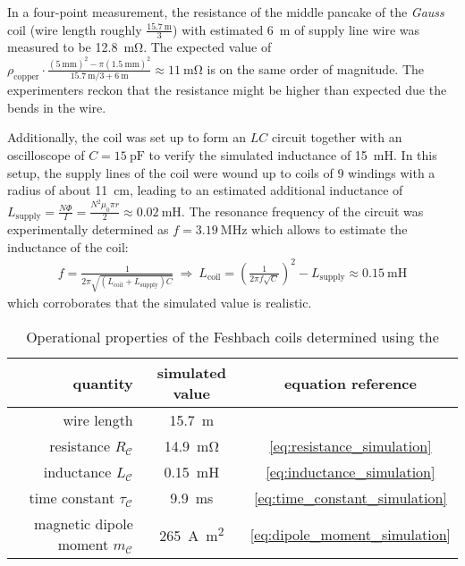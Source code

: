 In a four-point measurement, the resistance of the middle pancake of the \textit{Gauss} coil (wire length roughly $\frac{\SI{15.7}{\meter}}{3}$) with estimated \SI{6}{\meter} of supply line wire was measured to be \SI{12.8}{\milli\ohm}. The expected value of $\rho_\text{copper} \cdot \frac{(\SI{5}{\milli\meter})^2 - \pi(\SI{1.5}{\milli\meter})^2}{\SI{15.7}{\meter}/3 + \SI{6}{\meter}} \approx \SI{11}{\milli\ohm}$ is on the same order of magnitude. The experimenters reckon that the resistance might be higher than expected due the bends in the wire.

Additionally, the coil was set up to form an $LC$ circuit together with an oscilloscope of $C = \SI{15}{\pico\farad}$ to verify the simulated inductance of \SI{15}{\milli\henry}. In this setup, the supply lines of the coil were wound up to coils of $9$ windings with a radius of about \SI{11}{\centi\meter}, leading to an estimated additional inductance of $L_\text{supply} = \frac{N\Phi}{I} = \frac{N^2\mu_0\pi r}{2} \approx \SI{0.02}{\milli\henry}$. The resonance frequency of the circuit was experimentally determined as $f = \SI{3.19}{\mega\hertz}$ which allows to estimate the inductance of the coil:
\begin{align}
    f = \frac{1}{2\pi \sqrt{(L_\text{coil} + L_\text{supply})C}} ~\Rightarrow~ L_\text{coil} = \left(\frac{1}{2\pi f \sqrt{C}}\right)^2 - L_\text{supply} \approx \SI{0.15}{\milli\henry}
\end{align}
which corroborates that the simulated value is realistic.

\begin{table}
    \centering
    \begin{tabular}{rcc}
        \toprule
        \textbf{quantity} & \textbf{simulated value}  & \textbf{equation reference} \\
        \toprule
        wire length & \SI{15.7}{\meter} & \\
        resistance $R_\mathcal{C}$ & \SI{14.9}{\milli\ohm} & \eqref {eq:resistance_simulation} \\
        inductance $L_\mathcal{C}$ & \SI{0.15}{\milli\henry} & \eqref{eq:inductance_simulation} \\ 
        time constant $\tau_\mathcal{C}$ & \SI{9.9}{\milli\second} & \eqref{eq:time_constant_simulation}\\
        magnetic dipole moment $m_\mathcal{C}$ & \SI{265}{\ampere\square\meter} & \eqref{eq:dipole_moment_simulation} \\
        \bottomrule
    \end{tabular}
    \caption{Operational properties of the Feshbach coils determined using the }
    \label{tab:operational_properties}
\end{table}

